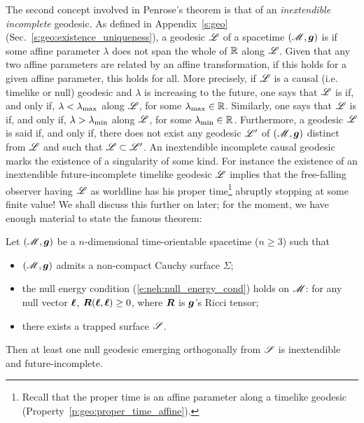 The second concept involved in Penrose's theorem is that of
an \emph{inextendible incomplete} geodesic. As defined in
Appendix~\ref{s:geo} (Sec.~\ref{s:geo:existence_uniqueness}), a
geodesic $\mathscr{L}$ of a spacetime $(\mathscr{M},\bm{g})$ is  if some affine parameter $\lambda$ does not
span the whole of $\mathbb{R}$ along $\mathscr{L}$.
Given that any two affine parameters are related by
an affine transformation, if this holds for a given affine parameter, this holds for all.
More precisely, if $\mathscr{L}$ is a causal (i.e. timelike or null) geodesic and $\lambda$ is increasing to the future, one says that $\mathscr{L}$
is  if, and only if, $\lambda < \lambda_{\rm max}$
along $\mathscr{L}$, for some $\lambda_{\rm max}\in\mathbb{R}$.
Similarly, one says that $\mathscr{L}$
is  if, and only if,
$\lambda > \lambda_{\rm min}$ along $\mathscr{L}$, for some $\lambda_{\rm min}\in\mathbb{R}$.
Furthermore, a geodesic $\mathscr{L}$ is said  if, and only if,
there does not exist any geodesic $\mathscr{L}'$ of $(\mathscr{M},\bm{g})$ distinct from $\mathscr{L}$
and such that $\mathscr{L}\subset\mathscr{L}'$. An inextendible incomplete causal geodesic
marks the existence of a singularity of some kind. For instance the existence of an
inextendible future-incomplete timelike geodesic $\mathscr{L}$ implies that the free-falling
observer having $\mathscr{L}$ as worldline has his proper time\footnote{Recall that
the proper time is an affine parameter along a timelike geodesic (Property~\ref{p:geo:proper_time_affine}).} abruptly
stopping at some finite value!
We shall discuss this further on later; for the moment, we have enough material
to state the famous theorem:

\begin{prop}
\label{p:loc:Penrose_sing_thm}
Let $(\mathscr{M},\bm{g})$ be a $n$-dimensional time-orientable spacetime ($n\ge 3$) such that
\begin{itemize}
\item $(\mathscr{M},\bm{g})$ admits a non-compact Cauchy surface $\Sigma$;
\item the null energy condition (\ref{e:neh:null_energy_cond}) holds on $\mathscr{M}$:
for any null vector $\bm{\ell}$, $\bm{R}(\bm{\ell}, \bm{\ell}) \geq 0$, where $\bm{R}$ is
$\bm{g}$'s Ricci tensor;
\item there exists a trapped surface $\mathscr{S}$.
\end{itemize}
Then at least one null geodesic emerging orthogonally from $\mathscr{S}$
is inextendible and future-incomplete.
\end{prop}

